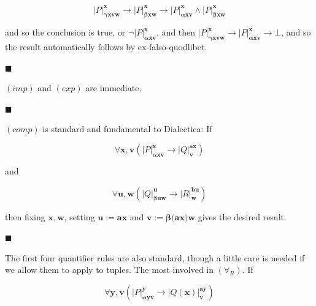 \documentclass[10pt,a4paper]{article}
\begin{document}
\par  \quad  \[|{P}|^{\bm{x}}_{\bm{\gamma}\bm{x}\bm{v}\bm{w}}\to|{P}|^{\bm{x}}_{\bm{\beta}\bm{x}\bm{w}}\to|{P}|^{\bm{x}}_{\bm{\alpha}\bm{x}\bm{v}}\wedge|{P}|^{\bm{x}}_{\bm{\beta}\bm{x}\bm{w}}\]\quad  \quad  
  
and so the conclusion is true, or $\neg|{P}|^{\bm{x}}_{\bm{\alpha}\bm{x}\bm{v}}$, and then $|{P}|^{\bm{x}}_{\bm{\gamma}\bm{x}\bm{v}\bm{w}}\to|{P}|^{\bm{x}}_{\bm{\alpha}\bm{x}\bm{v}}\to\bot$, and so the result automatically follows by ex-falso-quodlibet.\par
 
 
 
\par\noindent  $\blacksquare$ 
 
$(imp)$ and $(exp)$ are immediate.\par
 
 
 
\par\noindent  $\blacksquare$ 
 
$(comp)$ is standard and fundamental to Dialectica: If\par
  
\par  \quad  \[\forall\bm{x},\bm{v}\left(|{P}|^{\bm{x}}_{\bm{\alpha}\bm{x}\bm{v}}\to|{Q}|^{\bm{a}\bm{x}}_{\bm{v}}\right)\]\quad  \quad  
  
and\par
  
\par  \quad  \[\forall\bm{u},\bm{w}\left(|{Q}|^{\bm{u}}_{\bm{\beta}\bm{u}\bm{w}}\to|{R}|^{\bm{b}\bm{u}}_{\bm{w}}\right)\]\quad  \quad  
  
then fixing $\bm{x},\bm{w}$, setting $\bm{u}:=\bm{a}\bm{x}$ and $\bm{v}:=\bm{\beta}\bm{(}\bm{a}\bm{x})\bm{w}$ gives the desired result.\par
 
 
 
\par\noindent  $\blacksquare$ 
 
The first four quantifier rules are also standard, though a little care is needed if we allow them to apply to tuples. The most involved in $(\forall_{R})$. If\par
  
\par  \quad  \[\forall\bm{y},\bm{v}\left(|{P}|^{\bm{y}}_{\bm{\alpha}\bm{y}\bm{v}}\to|{Q(\bm{x})}|^{\bm{a}\bm{y}}_{\bm{v}}\right)\]\quad  \quad  
  
\end{document}
